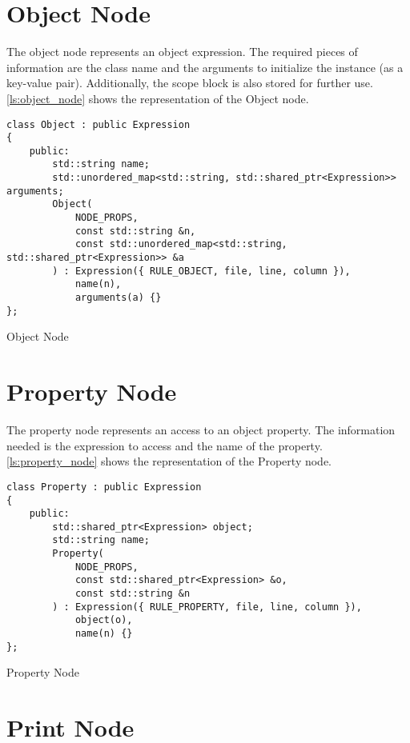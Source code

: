 \section{Object Node}

The object node represents an object expression. The required pieces of information are the class name and the arguments to initialize the instance (as a key-value pair).
Additionally, the scope block is also stored for further use.
\autoref{ls:object_node} shows the representation of the Object node.

\begin{listing}[H]
\begin{verbatim}
class Object : public Expression
{
    public:
        std::string name;
        std::unordered_map<std::string, std::shared_ptr<Expression>> arguments;
        Object(
            NODE_PROPS,
            const std::string &n,
            const std::unordered_map<std::string, std::shared_ptr<Expression>> &a
        ) : Expression({ RULE_OBJECT, file, line, column }),
            name(n),
            arguments(a) {}
};
\end{verbatim}
\caption{Object Node}
\label{ls:object_node}
\end{listing}

\section{Property Node}

The property node represents an access to an object property.
The information needed is the expression to access and the name of the property.
\autoref{ls:property_node} shows the representation of the Property node.

\begin{listing}[H]
\begin{verbatim}
class Property : public Expression
{
    public:
        std::shared_ptr<Expression> object;
        std::string name;
        Property(
            NODE_PROPS,
            const std::shared_ptr<Expression> &o,
            const std::string &n
        ) : Expression({ RULE_PROPERTY, file, line, column }),
            object(o),
            name(n) {}
};
\end{verbatim}
\caption{Property Node}
\label{ls:property_node}
\end{listing}

\section{Print Node}


